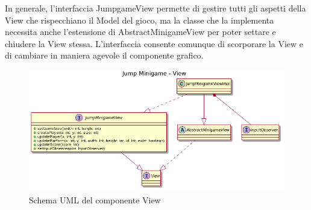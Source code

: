 \documentclass[a4paper,12pt]{report}
\begin{document}
	In generale, l'interfaccia JumpgameView permette di gestire tutti gli aspetti della View che rispecchiano il Model del gioco, ma la classe che la implementa necessita anche l'estensione di AbstractMinigameView per poter settare e chiudere la View stessa.
    L'interfaccia consente comunque di scorporare la View e di cambiare in maniera agevole il componente grafico.\newline
    \begin{figure}[!t]
        \centering{}
        \includegraphics[width=150mm]{images/picchiotti/jumpview.png}
        \caption{Schema UML del componente View}
        \label{img:jumpview}
    \end{figure}
\end{document}
